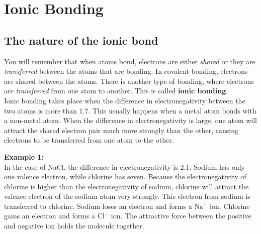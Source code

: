 



\section{Ionic Bonding}

\subsection{The nature of the ionic bond}

You will remember that when atoms bond, electrons are either \textit{shared} or they are \textit{transferred} between the atoms that are bonding. In covalent bonding, electrons are shared between the atoms. There is another type of bonding, where electrons are \textit{transferred} from one atom to another. This is called \textbf{ionic bonding}.\\

Ionic bonding takes place when the difference in electronegativity between the two atoms is more than 1.7. This usually happens when a metal atom bonds with a non-metal atom. When the difference in electronegativity is large, one atom will attract the shared electron pair much more strongly than the other, causing electrons to be transferred from one atom to the other.


\textbf{Example 1:}\\

In the case of NaCl, the difference in electronegativity is 2.1. Sodium has only one valence electron, while chlorine has seven. Because the electronegativity of chlorine is higher than the electronegativity of sodium, chlorine will attract the valence electron of the sodium atom very strongly. This electron from sodium is transferred to chlorine. Sodium loses an electron and forms a $\text{Na}^{+}$ ion. Chlorine gains an electron and forms a $\text{Cl}^{-}$ ion. The attractive force between the positive and negative ion holds the molecule together.\\

